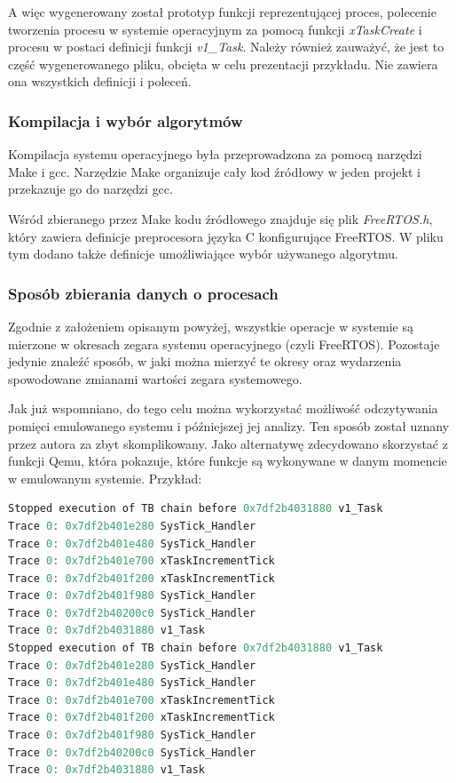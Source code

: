 \documentclass[../../main]{subfiles}
\begin{document}
A więc wygenerowany został prototyp funkcji reprezentującej proces, polecenie tworzenia procesu w systemie operacyjnym za pomocą funkcji \textit{xTaskCreate} i procesu w postaci definicji funkcji \textit{v1\_Task}. Należy również zauważyć, że jest to część wygenerowanego pliku, obcięta w celu prezentacji przykładu. Nie zawiera ona wszystkich definicji i poleceń.

\subsubsection{Kompilacja i wybór algorytmów}

Kompilacja systemu operacyjnego była przeprowadzona za pomocą narzędzi Make i \gls{gcc}. Narzędzie Make organizuje cały kod źródłowy w jeden projekt i przekazuje go do narzędzi \gls{gcc}.

Wśród zbieranego przez Make kodu źródłowego znajduje się plik \textit{FreeRTOS.h}, który zawiera definicje preprocesora języka C konfigurujące FreeRTOS. W pliku tym dodano także definicje umożliwiające wybór używanego algorytmu.

\subsubsection{Sposób zbierania danych o procesach}

Zgodnie z założeniem opisanym powyżej, wszystkie operacje w systemie są mierzone w okresach zegara systemu operacyjnego (czyli FreeRTOS). Pozostaje jedynie znaleźć sposób, w jaki można mierzyć te okresy oraz wydarzenia spowodowane zmianami wartości zegara systemowego.

Jak już wspomniano, do tego celu można wykorzystać możliwość odczytywania pomięci emulowanego systemu i późniejszej jej analizy. Ten sposób został uznany przez autora za zbyt skomplikowany. Jako alternatywę zdecydowano skorzystać z funkcji Qemu, która pokazuje, które funkcje są wykonywane w danym momencie w emulowanym systemie. Przykład:

\begin{lstlisting}[language=C, caption={Przykładowe logi z Qemu}, label={lst:qemu-example-logs}]
Stopped execution of TB chain before 0x7df2b4031880 v1_Task
Trace 0: 0x7df2b401e280 SysTick_Handler
Trace 0: 0x7df2b401e480 SysTick_Handler
Trace 0: 0x7df2b401e700 xTaskIncrementTick
Trace 0: 0x7df2b401f200 xTaskIncrementTick
Trace 0: 0x7df2b401f980 SysTick_Handler
Trace 0: 0x7df2b40200c0 SysTick_Handler
Trace 0: 0x7df2b4031880 v1_Task
Stopped execution of TB chain before 0x7df2b4031880 v1_Task
Trace 0: 0x7df2b401e280 SysTick_Handler
Trace 0: 0x7df2b401e480 SysTick_Handler
Trace 0: 0x7df2b401e700 xTaskIncrementTick
Trace 0: 0x7df2b401f200 xTaskIncrementTick
Trace 0: 0x7df2b401f980 SysTick_Handler
Trace 0: 0x7df2b40200c0 SysTick_Handler
Trace 0: 0x7df2b4031880 v1_Task
\end{lstlisting}
\end{document}
